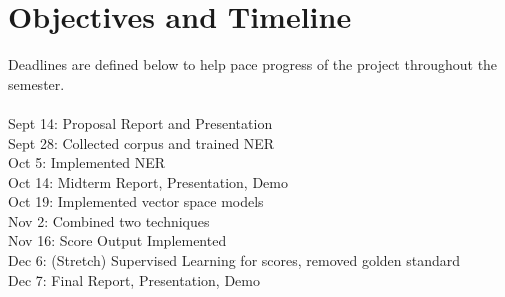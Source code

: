 \section{Objectives and Timeline}
\label{section:implementation}
Deadlines are defined below to help pace progress of the project throughout the semester. \\\\
Sept 14: Proposal Report and Presentation\\
Sept 28: Collected corpus and trained NER\\
  Oct 5: Implemented NER \\
 Oct 14: Midterm Report, Presentation, Demo\\
 Oct 19: Implemented vector space models\\
  Nov 2: Combined two techniques\\
 Nov 16: Score Output Implemented\\
  Dec 6: (Stretch) Supervised Learning for scores, removed golden standard\\
  Dec 7: Final Report, Presentation, Demo\\